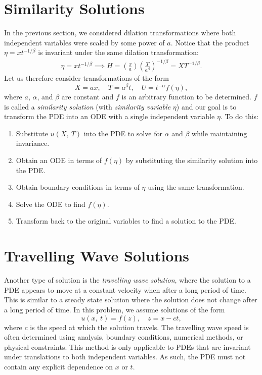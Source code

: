 \documentclass{article}
\theoremstyle{definition}
\begin{document}
\section{Similarity Solutions}
In the previous section, we considered dilation transformations where
both independent variables were scaled by some power of \(a\). Notice
that the product \(\eta = x t^{-1/\beta}\) is invariant under the same
dilation transformation:
\begin{align*}
    \eta = x t^{-1/\beta} \implies H = \left( \frac{x}{a} \right) \left( \frac{T}{a^\beta} \right)^{-1/\beta} = X T^{-1/\beta}.
\end{align*}
Let us therefore consider transformations of the form
\begin{equation*}
    X = a x, \quad T = a^\beta t, \quad U = t^{-\alpha} f\left( \eta \right),
\end{equation*}
where \(a\), \(\alpha\), and \(\beta\) are constant and \(f\) is an arbitrary
function to be determined. \(f\) is called a \textit{similarity solution}
(with \textit{similarity variable} \(\eta\)) and our goal is to
transform the PDE into an ODE with a single independent variable \(\eta\).
To do this:
\begin{enumerate}
    \item Substitute \(u\left( X,\: T \right)\) into the PDE to solve
          for \(\alpha\) and \(\beta\) while maintaining invariance.
    \item Obtain an ODE in terms of \(f\left( \eta \right)\) by
          substituting the similarity solution into the PDE.
    \item Obtain boundary conditions in terms of \(\eta\) using the
          same transformation.
    \item Solve the ODE to find \(f\left( \eta \right)\).
    \item Transform back to the original variables to find a solution
          to the PDE.
\end{enumerate}
\section{Travelling Wave Solutions}
Another type of solution is the \textit{travelling wave solution},
where the solution to a PDE appears to move at a constant velocity when
after a long period of time. This is similar to a steady state solution
where the solution does not change after a long period of time. In this
problem, we assume solutions of the form
\begin{equation*}
    u\left( x,\: t \right) = f\left( z \right), \quad z = x - c t,
\end{equation*}
where \(c\) is the speed at which the solution travels. The travelling
wave speed is often determined using analysis, boundary conditions,
numerical methods, or physical constraints. This method is only
applicable to PDEs that are invariant under translations to both
independent variables. As such, the PDE must not contain any explicit
dependence on \(x\) or \(t\).
\end{document}
